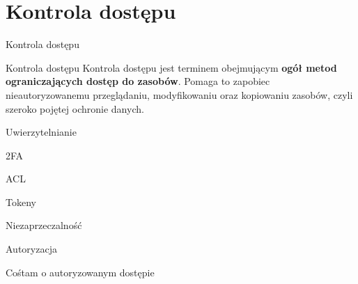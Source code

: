 \section{Kontrola dostępu}

\begin{frame}{Kontrola dostępu}
		\begin{alertblock}{Kontrola dostępu}
			Kontrola dostępu jest terminem obejmującym \textbf{ogół metod ograniczających dostęp do zasobów}.
			Pomaga to zapobiec nieautoryzowanemu przeglądaniu, modyfikowaniu oraz kopiowaniu zasobów, czyli szeroko pojętej ochronie danych. 
		\end{alertblock}
		
		\vspace{\fill}
		
\end{frame}


\begin{frame}{Uwierzytelnianie}

\end{frame}

\begin{frame}{2FA}
	
\end{frame}

\begin{frame}{ACL}
	
\end{frame}

\begin{frame}{Tokeny}
	
\end{frame}

\begin{frame}{Niezaprzeczalność}
	
\end{frame}

\begin{frame}{Autoryzacja}
	
\end{frame}

\begin{frame}{Cośtam o autoryzowanym dostępie}
	
\end{frame}


